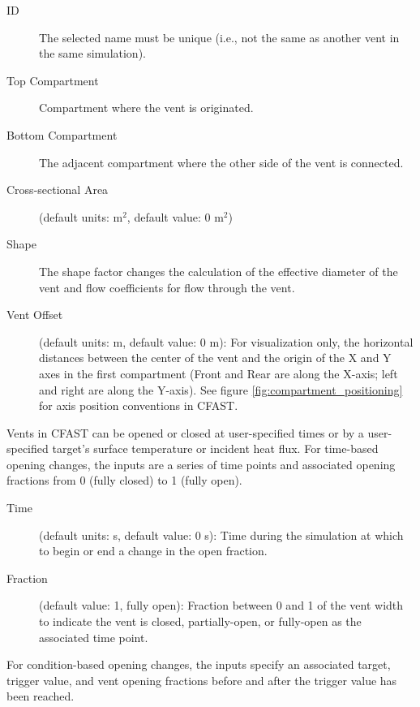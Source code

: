 \begin{description}
\item[ID] The selected name must be unique (i.e., not the same as another vent in the same simulation).
\item[Top Compartment] Compartment where the vent is originated.
\item[Bottom Compartment] The adjacent compartment where the other side of the vent is connected.
\label{Ceil Cross-sectional Area}
\item[Cross-sectional Area] (default units: m$^2$, default value: 0 m$^2$)
\label{Ceil Shape}
\item[Shape] The shape factor changes the calculation of the effective diameter of the vent and flow coefficients for flow through the vent.
\item[Vent Offset] (default units: m, default value: 0 m): For visualization only, the horizontal distances between the center of the vent and the origin of the X and Y axes in the first compartment (Front and Rear are along the X-axis; left and right are along the Y-axis). See figure \ref{fig:compartment_positioning} for axis position conventions in CFAST.
\end{description}

Vents in CFAST can be opened or closed at user-specified times or by a user-specified target's surface temperature or incident heat flux. For time-based opening changes, the inputs are a series of time points and associated opening fractions from 0 (fully closed) to 1 (fully open).

\begin{description}
\item[Time] (default units: s, default value: 0 s): Time during the simulation at which to begin or end a change in the open fraction.
\item[Fraction] (default value: 1, fully open): Fraction between 0 and 1 of the vent width to indicate the vent is closed, partially-open, or fully-open as the associated time point.
\end{description}

For condition-based opening changes, the inputs specify an associated target, trigger value, and vent opening fractions before and after the trigger value has been reached.

